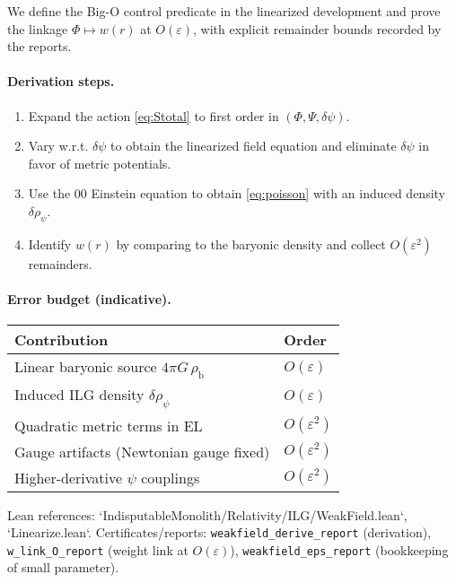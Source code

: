 \documentclass[11pt]{article}
\begin{document}
We define the Big-O control predicate in the linearized development and prove the linkage $\Phi\mapsto w(r)$ at $O(\varepsilon)$, with explicit remainder bounds recorded by the reports.

\paragraph{Derivation steps.}
\begin{enumerate}
  \item Expand the action \eqref{eq:Stotal} to first order in $(\Phi,\Psi,\delta\psi)$.
  \item Vary w.r.t. $\delta\psi$ to obtain the linearized field equation and eliminate $\delta\psi$ in favor of metric potentials.
  \item Use the $00$ Einstein equation to obtain \eqref{eq:poisson} with an induced density $\delta\rho_\psi$.
  \item Identify $w(r)$ by comparing to the baryonic density and collect $O(\varepsilon^2)$ remainders.
\end{enumerate}

\paragraph{Error budget (indicative).}
\begin{center}
\begin{tabular}{l l}
\hline
Contribution & Order \\
\hline
Linear baryonic source $4\pi G\,\rho_{\mathrm{b}}$ & $O(\varepsilon)$ \\
Induced ILG density $\delta\rho_\psi$ & $O(\varepsilon)$ \\
Quadratic metric terms in EL & $O(\varepsilon^2)$ \\
Gauge artifacts (Newtonian gauge fixed) & $O(\varepsilon^2)$ \\
Higher-derivative $\psi$ couplings & $O(\varepsilon^2)$ \\
\hline
\end{tabular}
\end{center}

Lean references: `IndisputableMonolith/Relativity/ILG/WeakField.lean`, `Linearize.lean`. Certificates/reports: \texttt{weakfield\_derive\_report} (derivation), \texttt{w\_link\_O\_report} (weight link at $O(\varepsilon)$), \texttt{weakfield\_eps\_report} (bookkeeping of small parameter).
\end{document}
